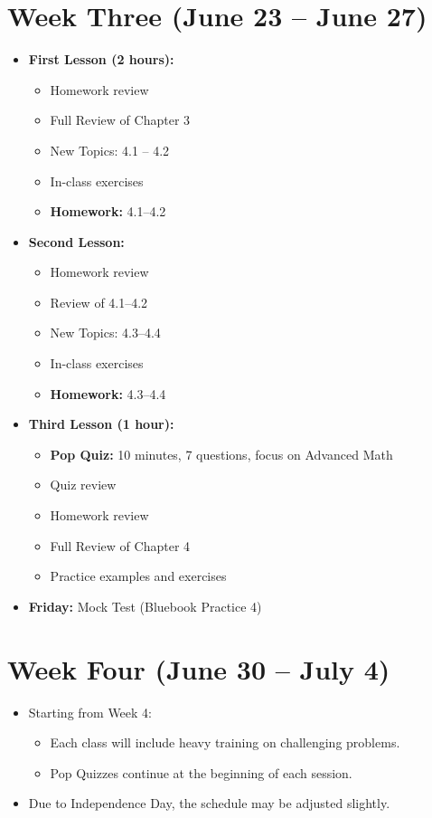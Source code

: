 \documentclass{article}
\begin{document}
\newpage

\section*{Week Three (June 23 -- June 27)}

\begin{itemize}[leftmargin=*]
    \item \textbf{First Lesson (2 hours):}
    \begin{itemize}
        \item Homework review
        \item Full Review of Chapter 3
        \item New Topics: 4.1 -- 4.2
        \item In-class exercises
        \item \textbf{Homework:} 4.1--4.2
    \end{itemize}
    \item \textbf{Second Lesson:}
    \begin{itemize}
        \item Homework review
        \item Review of 4.1--4.2
        \item New Topics: 4.3--4.4
        \item In-class exercises
        \item \textbf{Homework:} 4.3--4.4
    \end{itemize}
    \item \textbf{Third Lesson (1 hour):}
    \begin{itemize}
        \item \textbf{Pop Quiz:} 10 minutes, 7 questions, focus on Advanced Math
        \item Quiz review
        \item Homework review
        \item Full Review of Chapter 4
        \item Practice examples and exercises
    \end{itemize}
    \item \textbf{Friday:} Mock Test (Bluebook Practice 4)
\end{itemize}



\newpage

\section*{Week Four (June 30 -- July 4)}

\begin{itemize}[leftmargin=*]
    \item Starting from Week 4:
    \begin{itemize}
        \item Each class will include heavy training on challenging problems.
        \item Pop Quizzes continue at the beginning of each session.
    \end{itemize}
    \item Due to Independence Day, the schedule may be adjusted slightly.
\end{itemize}
\end{document}
